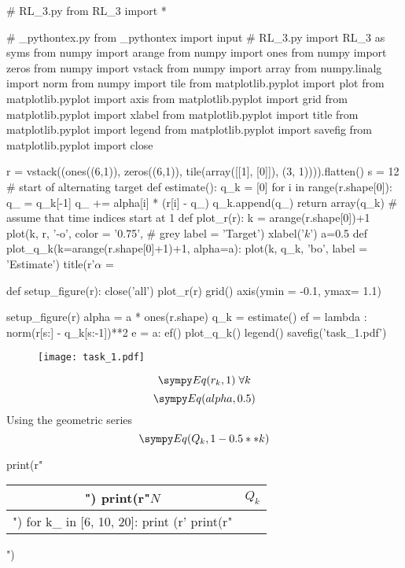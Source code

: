 

\begin{sympycode}
# RL_3.py
from RL_3 import *
\end{sympycode}

\begin{pycode}	

# _pythontex.py
from _pythontex import input
# RL_3.py
import RL_3 as syms 
from numpy import arange
from numpy import ones
from numpy import zeros
from numpy import vstack
from numpy import array
from numpy.linalg import norm
from numpy import tile
from matplotlib.pyplot import plot
from matplotlib.pyplot import axis
from matplotlib.pyplot import grid
from matplotlib.pyplot import xlabel
from matplotlib.pyplot import title
from matplotlib.pyplot import legend
from matplotlib.pyplot import savefig
from matplotlib.pyplot import close

r = vstack((ones((6,1)), zeros((6,1)), tile(array([[1], [0]]), (3, 1)))).flatten()
s = 12 # start of alternating target
def estimate():
	q_k = [0] 
	for i in range(r.shape[0]):
		q_   =  q_k[-1] 
		q_  += alpha[i] * (r[i] - q_)	
		q_k.append(q_)
	return array(q_k)
# assume that time indices start at 1
def plot_r(r):
	k = arange(r.shape[0])+1
	plot(k, r, '-o', color = '0.75', # grey
	label = 'Target')
	xlabel('$k$')
a=0.5
def plot_q_k(k=arange(r.shape[0]+1)+1, alpha=a):
	plot(k, q_k, 'bo', 
	label = 'Estimate')
	title(r'$\alpha$ = %

def setup_figure(r):
	close('all')
	plot_r(r)
	grid()
	axis(ymin = -0.1, ymax= 1.1)

\end{pycode}
\begin{pycode}

setup_figure(r)
alpha = a * ones(r.shape)
q_k = estimate()
ef = lambda : norm(r[s:] - q_k[s:-1])**2
e = {a: ef()}
plot_q_k()
legend()
savefig('task_1.pdf')

\end{pycode}

\begin{figure}[ht]
\texttt{[image: task\_1.pdf]}
\end{figure}
$$\s{Eq(r_k, 1)} \; \forall k$$
$$\s{Eq(alpha, 0.5)}$$ 
Using the geometric series
$$\s{Eq(Q_k, 1 - 0.5**k)}$$

\begin{pycode}

print(r"\begin{tabular}{c|c}")
print(r"$N$ & $Q_k$ \\ \hline")
for k_ in [6, 10, 20]:
	print (r'%
print(r"\end{tabular}")

\end{pycode}

